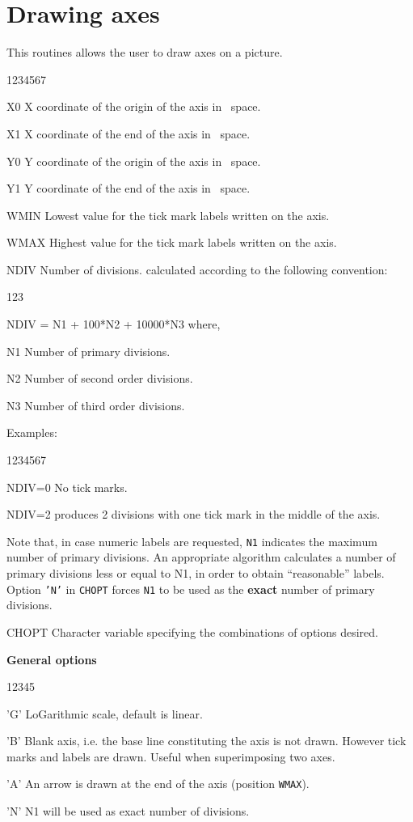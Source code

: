 \section{Drawing axes}
\Action
This routines allows the user to draw axes on a picture.
\Pdesc
\begin{DLtt}{1234567}
\item[X0]   X coordinate of the origin of the axis in \WC~space.
\item[X1]   X coordinate of the end of the axis in \WC~space.
\item[Y0]   Y coordinate of the origin of the axis in \WC~space.
\item[Y1]   Y coordinate of the end of the axis in \WC~space.
\item[WMIN] Lowest value for the tick mark labels written on the axis.
\item[WMAX] Highest value for the tick mark labels written on the axis.
\item[NDIV] Number of divisions. calculated according to the following
            convention:
\begin{DLtt}{123}
\item[NDIV = N1 + 100*N2 + 10000*N3] where,
\item[N1] Number of primary divisions.
\item[N2] Number of second order divisions.
\item[N3] Number of third order divisions.
\end{DLtt}
Examples:
\begin{DLtt}{1234567}
\item[NDIV=0] No tick marks.
\item[NDIV=2] produces 2 divisions with one tick mark in the middle of the axis.
\end{DLtt}
Note that, in case numeric labels are requested, {\tt N1} indicates the maximum
number of primary divisions. An appropriate algorithm calculates a number of
primary divisions less or equal to N1, in order to obtain ``reasonable'' labels.
Option {\tt'N'} in {\tt CHOPT} forces {\tt N1} to be used as the {\bf exact}
number of primary divisions.
\item[CHOPT] Character variable specifying the combinations of options desired.
\par {\bf General options}
\begin{DLtt}{12345}
\item['G'] LoGarithmic scale, default is linear.
\item['B'] Blank axis, i.e. the base line constituting the axis is not drawn.
           However tick marks and labels are drawn. Useful when superimposing
           two axes.
\item['A'] An arrow is drawn at the end of the axis (position {\tt WMAX}).
\item['N'] N1 will be used as exact number of divisions.
\end{DLtt}
 

\end{DLtt}
